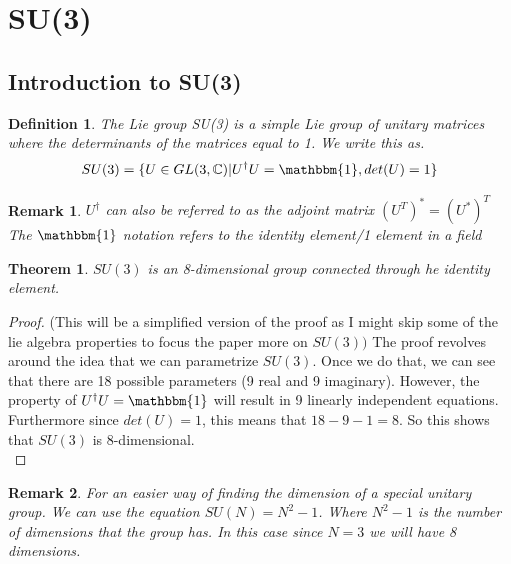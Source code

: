 \documentclass[12pt]{article}
\newcommand{\C}{\mathbb{C}}
\newtheorem{thm}{Theorem}[section]
\newtheorem{definition}{Definition}
\newtheorem*{rem}{Remark}
\begin{document}
\section{SU(3)}
\subsection{Introduction to SU(3)}
\begin{definition}
The Lie group SU(3) is a simple Lie group of unitary matrices where the determinants of the matrices equal to 1. We write this as.
\[ SU(3) = \{ U \in GL(3,\C) | U^{\dagger} U = \mathbbm{1}, det(U) = 1 \} \]
\end{definition}
\begin{rem}
$U^{\dagger}$ can also be referred to as the adjoint matrix $(U^T)^* = (U^*)^T$\\
The $\mathbbm{1}$ notation refers to the identity element/1 element in a field
\end{rem}
\begin{thm}
$SU(3)$ is an 8-dimensional group connected through he identity element.\\
\end{thm}
\begin{proof}
(This will be a simplified version of the proof as I might skip some of the lie algebra properties to focus the paper more on $SU(3))$ The proof revolves around the idea that we can parametrize $SU(3)$. Once we do that, we can see that there are 18 possible parameters (9 real and 9 imaginary). However, the property of $U^{\dagger}U = \mathbbm{1}$ will result in 9 linearly independent equations. Furthermore since $det(U) = 1$, this means that $18 -9 -1 =8$. So this shows that $SU(3)$ is 8-dimensional.\\
\end{proof}
\begin{rem}
For an easier way of finding the dimension of a special unitary group. We can use the equation $SU(N) = N^2 - 1$. Where $N^2 - 1$ is the number of dimensions that the group has. In this case since $N = 3$ we will have 8 dimensions.
\end{rem}
\end{document}
